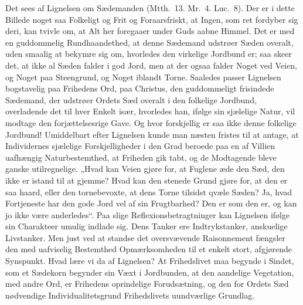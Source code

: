 \documentclass[12pt]{book}
\begin{document}
Det sees af Lignelsen om Sædemanden (Mtth.\ 13. Mr.\ 4. Luc.\ 8).
Der er i dette Billede noget saa Folkeligt og Frit og Foraarsfriskt,
at Ingen, som ret fordyber sig deri, kan tvivle om, at Alt her
foregaaer under Guds aabne Himmel. Det er med en guddommelig
Rundhaandethed, at denne Sædemand udstrøer Sæden overalt, uden
smaalig at bekymre sig om, hvorledes den virkelige Jordbund er; saa
skeer det, at ikke al Sæden falder i god Jord, men at der ogsaa
falder Noget ved Veien, og Noget paa Steengrund, og Noget iblandt
Torne. Saaledes passer Lignelsen bogstavelig paa Frihedens Ord, paa
Christus, den guddommeligt frisindede Sædemand, der udstrøer Ordets
Sæd overalt i den folkelige Jordbund,
overladende det til hver Enkelt især, hvorledes han, ifølge sin
sjælelige Natur, vil modtage den forjættelsesrige Gave. Og hvor
forskjellig er saa ikke denne folkelige Jordbund! Umiddelbart efter
Lignelsen kunde man næsten fristes til at antage, at Individernes
sjælelige Forskjelligheder i den Grad beroede paa en af Villien
uafhængig Naturbestemthed, at Friheden gik tabt, og de Modtagende
bleve ganske utilregnelige. „Hvad kan Veien gjøre for, at Fuglene
æde den Sæd, den ikke er istand til at gjemme? Hvad kan den stenede
Grund gjøre for, at den er saa haard, eller den tornebevoxte, at
dens Torne tilsidst qvæle Sæden? Ja, hvad Fortjeneste har den gode
Jord vel af sin Frugtbarhed? Den er som den er, og kan jo ikke være
anderledes“. Paa slige Reflexionsbetragtninger kan Lignelsen ifølge
sin Charakteer umulig indlade sig. Dens Tanker ere Indtrykstanker,
anskuelige Livstanker. Men just ved at standse det oversvævende
Raisonnement fængsler den med uafviselig Bestemthed Opmærksomheden
til et enkelt stort, afgjørende Synspunkt. Hvad lære vi da af
Lignelsen? At Frihedslivet maa begynde i Sindet, som et Sædekorn
begynder sin Væxt i Jordbunden, at den aandelige Vegetation, med
andre Ord, er Frihedens oprindelige Forudsætning, og den for Ordets
Sæd nødvendige Individualitetsgrund Frihedslivets uundværlige
Grundlag.
\end{document}
